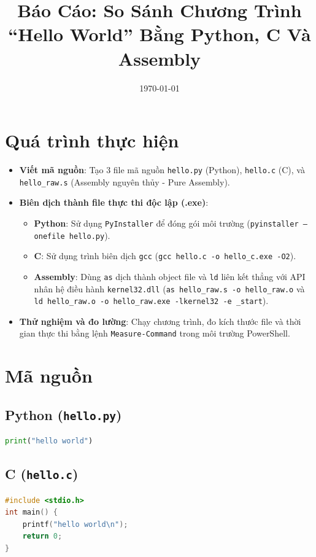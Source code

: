 \documentclass[12pt,a4paper]{article}
\title{Báo Cáo: So Sánh Chương Trình ``Hello World'' Bằng Python, C Và Assembly}
\author{}
\date{\today}
\begin{document}
\maketitle

\section{Quá trình thực hiện}
\begin{itemize}
    \item \textbf{Viết mã nguồn}: 
    Tạo 3 file mã nguồn \texttt{hello.py} (Python), \texttt{hello.c} (C), và \texttt{hello\_raw.s} (Assembly nguyên thủy - Pure Assembly).
    
    \item \textbf{Biên dịch thành file thực thi độc lập (.exe)}:
    \begin{itemize}
        \item \textbf{Python}: Sử dụng \texttt{PyInstaller} để đóng gói môi trường (\texttt{pyinstaller --onefile hello.py}).
        \item \textbf{C}: Sử dụng trình biên dịch \texttt{gcc} (\texttt{gcc hello.c -o hello\_c.exe -O2}).
        \item \textbf{Assembly}: Dùng \texttt{as} dịch thành object file và \texttt{ld} liên kết thẳng với API nhân hệ điều hành \texttt{kernel32.dll} (\texttt{as hello\_raw.s -o hello\_raw.o} và \texttt{ld hello\_raw.o -o hello\_raw.exe -lkernel32 -e \_start}).
    \end{itemize}
    
    \item \textbf{Thử nghiệm và đo lường}: Chạy chương trình, đo kích thước file và thời gian thực thi bằng lệnh \texttt{Measure-Command} trong môi trường PowerShell.
\end{itemize}

\section{Mã nguồn}

\subsection{Python (\texttt{hello.py})}
\begin{lstlisting}[language=Python]
print("hello world")
\end{lstlisting}

\subsection{C (\texttt{hello.c})}
\begin{lstlisting}[language=C]
#include <stdio.h>
int main() {
    printf("hello world\n");
    return 0;
}
\end{lstlisting}
\end{document}
